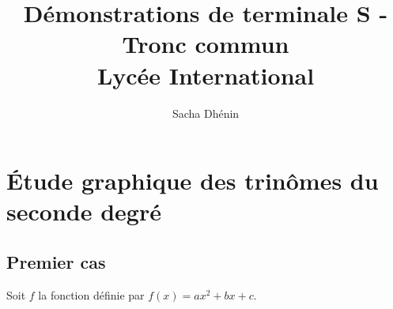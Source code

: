 

\usepackage{parcolumns}

        \title {Démonstrations de terminale S - Tronc commun \\
                Lycée International}

        \author{Sacha Dhénin}
        
\usepackage{amsthm}
\usepackage{tikzsymbols}





\newpage



\thispagestyle{empty}




\newpage

\vspace*{-2cm}

\section*{Étude graphique des trinômes du seconde degré}


\subsection*{Premier cas}

Soit $f$ la fonction définie par $f(x) = ax^2 + bx + c$. 

\bigskip 


